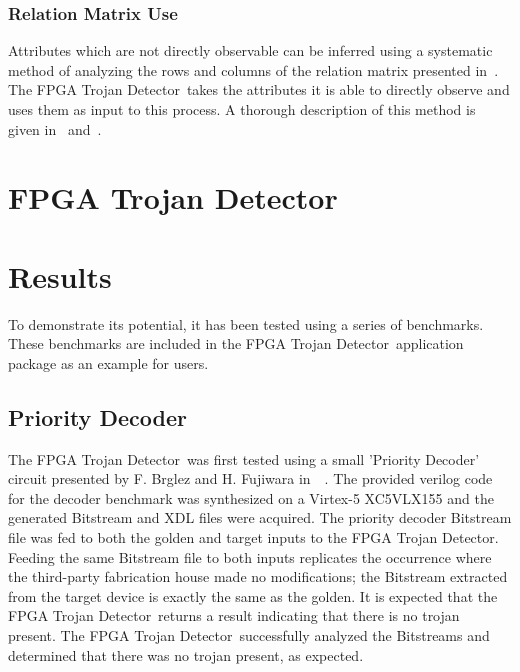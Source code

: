 \documentclass[conference]{IEEEtran}
\newcommand{\Name}{\acrshort{FPGA} Trojan Detector}
\newcommand{\NameNoPeriod}{\Name~}
\begin{document}
\subsubsection{Relation Matrix Use} \label{sec:matrixUse}
Attributes which are not directly observable can be inferred using a systematic method of analyzing the rows and columns of the relation matrix presented in~\cite{samerAttribute}.
The \NameNoPeriod takes the attributes it is able to directly observe and uses them as input to this process.
A thorough description of this method is given in~\cite{samerDissertation} and~\cite{meCategorization}.
\section{\Name}
\section{Results}
To demonstrate its potential, it has been tested using a series of benchmarks.
These benchmarks are included in the \NameNoPeriod application package as an example for users.
\subsection{Priority Decoder} \label{sec:priorityDecoder}
The \NameNoPeriod was first tested using a small 'Priority Decoder' circuit presented by F. Brglez and H. Fujiwara
in~~\cite{iscas85}.
The provided verilog code for the decoder benchmark was synthesized on a Virtex-5 XC5VLX155 and the generated \gls{Bitstream} and \acrshort{XDL} files were acquired.
The priority decoder \gls{Bitstream} file was fed to both the \gls{golden} and \gls{target} inputs to the \Name.
Feeding the same \gls{Bitstream} file to both inputs replicates the occurrence where the third-party fabrication house made no modifications; the \gls{Bitstream} extracted from the \gls{target} device is exactly the same as the \gls{golden}.
It is expected that the \NameNoPeriod returns a result indicating that there is no trojan present.
The \NameNoPeriod successfully analyzed the \gls{Bitstream}s and determined that there was no trojan present, as expected.
\end{document}
